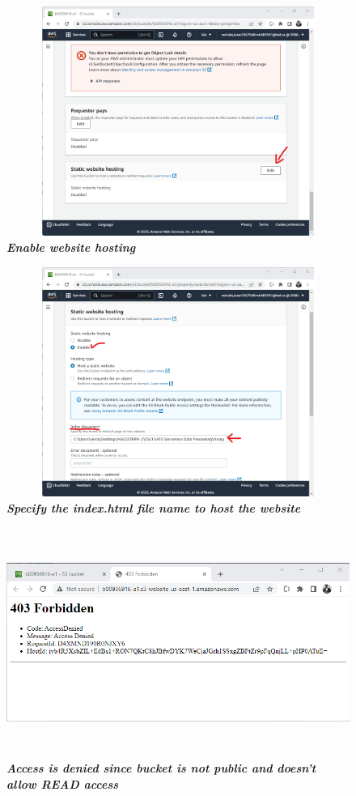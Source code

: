 \begin{figure}[htp]
    \centering
    \includegraphics[scale=1, width=15cm,height=7.5cm]{PROBLEM 2/Snaps/4. Goto Properties-Enable website hosting.png}
    \caption{\textbf{\textit{Enable website hosting}}}
    \label{fig:enable_hosting}
\end{figure}

\begin{figure}[htp]
    \centering
    \includegraphics[scale=1, width=15cm,height=7.5cm]{PROBLEM 2/Snaps/5. Specify index.html file.png}
    \caption{\textbf{\textit{Specify the index.html file name to host the website }}}
    \label{fig:Specify_index_file}
\end{figure}

\begin{figure}[htp]
    \centering
    \includegraphics[scale=1, width=15cm,height=7.5cm]{PROBLEM 2/Snaps/6. Access denied.png}
    \caption{\textbf{\textit{Access is denied since bucket is not public and doesn't allow READ access }}}
    \label{fig:access_denied}
\end{figure}

